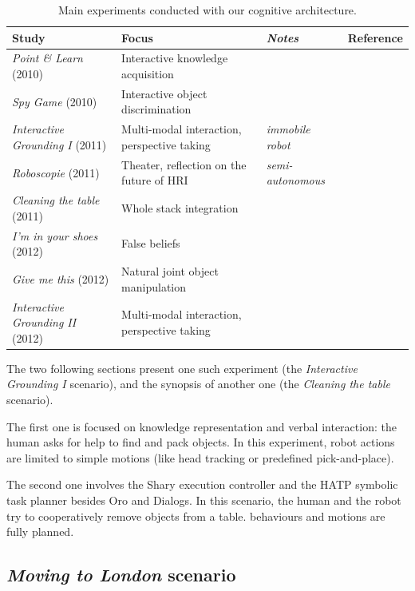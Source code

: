 \documentclass[preprint,3p,times]{elsarticle}
\begin{document}
\begin{table}
\begin{center}

\begin{tabular}{llll}
 \bf{Study} & Focus & \emph{Notes} & Reference \\
\hline
{\it Point \& Learn} (2010) & Interactive knowledge acquisition & & \cite{Lemaignan2010} \\
{\it Spy Game} (2010) & Interactive object discrimination & & \cite{Ros2010b} \\
{\it Interactive Grounding I} (2011) & Multi-modal interaction, perspective taking & \emph{immobile robot} & \cite{lemaignan2011what} \\
{\it Roboscopie} (2011) & Theater, reflection on the future of HRI & \emph{semi-autonomous} & \cite{lemaignan2012roboscopie} \\
{\it Cleaning the table} (2011) & Whole stack integration & & \cite{Alami2011} \\
{\it I'm in your shoes} (2012) & False beliefs & & \cite{warnier2012when} \\
{\it Give me this} (2012) & Natural joint object manipulation & & \cite{gharbi2013natural} \\
{\it Interactive Grounding II} (2012) & Multi-modal interaction, perspective taking & & \cite{lemaignan2013talking} \\
\hline

\end{tabular}
\end{center}
\caption{Main experiments conducted with our cognitive architecture.}
\label{table|experiences}
\end{table}

The two following sections present one such experiment (the {\it Interactive
Grounding I} scenario), and the synopsis of another one (the {\it Cleaning the
table} scenario).

The first one is focused on knowledge representation and verbal interaction:
the human asks for help to find and pack objects. In this experiment, robot
actions are limited to simple motions (like head tracking or predefined
pick-and-place).

The second one involves the {\sc Shary} execution controller and the HATP symbolic
task planner besides {\sc Oro} and {\sc Dialogs}. In this scenario, the human and the
robot try to cooperatively remove objects from a table. behaviours and motions
are fully planned.

\subsection{\emph{Moving to London} scenario}
\label{moving-london}
\end{document}
